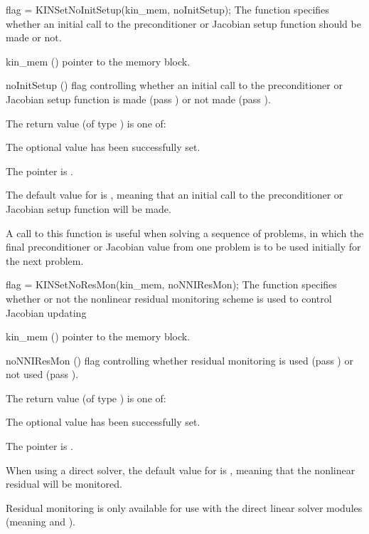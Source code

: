 {
flag = KINSetNoInitSetup(kin\_mem, noInitSetup);
}
{
  The function  specifies whether an initial call
  to the preconditioner or Jacobian setup function should be made or not.
}
{
  \begin{args}[noInitSeti[]
  \item[kin\_mem] ()
    pointer to the {\kinsol} memory block.
  \item[noInitSetup] ()
    flag controlling whether an initial call to the preconditioner or Jacobian
    setup function is made (pass ) or not made (pass ).
  \end{args}
}
{
  The return value  (of type ) is one of:
  \begin{args}
  \item[\Id{KIN\_SUCCESS}] 
    The optional value has been successfully set.
  \item[\Id{KIN\_MEM\_NULL}]
    The  pointer is .
  \end{args}
}
{
  The default value for  is , meaning that an initial call
  to the preconditioner or Jacobian setup function will be made.

  A call to this function is useful when solving a sequence of problems, in which
  the final preconditioner or Jacobian value from one problem is to be used initially
  for the next problem. 
}
{
flag = KINSetNoResMon(kin\_mem, noNNIResMon);
}
{
  The function  specifies whether or not the nonlinear
  residual monitoring scheme is used to control Jacobian updating
}
{
  \begin{args}[noNNIResMon]
  \item[kin\_mem] ()
    pointer to the {\kinsol} memory block.
  \item[noNNIResMon] ()
    flag controlling whether residual monitoring is used (pass )
    or not used (pass ).

  \end{args}
}
{
  The return value  (of type ) is one of:
  \begin{args}
  \item[\Id{KIN\_SUCCESS}] 
    The optional value has been successfully set.
  \item[\Id{KIN\_MEM\_NULL}]
    The  pointer is .
  \end{args}
}
{
  When using a direct solver, the default value for  is ,
  meaning that the nonlinear residual will be monitored.

  {\warn}Residual monitoring is only available for use with the direct linear solver
  modules (meaning {\kindense} and {\kinband}).
}
